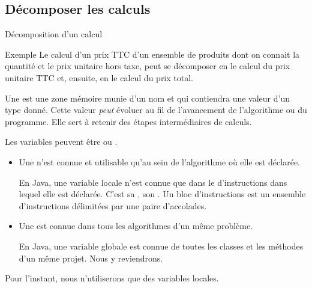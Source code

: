 \begin{hideedit}
\subsection{Décomposer les calculs}
\begin{frame}{Décomposition d'un calcul}
  \begin{block}{Exemple}
    Le calcul d'un prix TTC d'un ensemble de produits dont on connait la
    quantité et le prix unitaire hors taxe, peut se décomposer en le calcul
    du prix unitaire TTC et, ensuite, en le calcul du prix total.
  \end{block}
\end{frame}

\begin{frame}
  \begin{definition}[Variable]
    Une  est une zone mémoire munie
    d'un nom et qui contiendra une valeur d’un type donné.  Cette valeur
    \emph{peut} évoluer au fil de l'avancement de l'algorithme ou du
    programme.  Elle sert à retenir des étapes intermédiaires de
    calculs.
  \end{definition}
\end{frame}

\begin{frame}
  Les variables peuvent être  ou .

  \begin{itemize}
    \item Une  n'est
      connue et utilisable qu'au sein de l'algorithme où elle est
      déclarée.

      En Java, une variable locale n'est connue que dans le
       d'instructions dans lequel elle est déclarée.
      C'est sa , son .
      Un bloc d'instructions est un ensemble
      d'instructions délimitées par une paire d'accolades.

    \item Une  est
      connue dans tous les algorithmes d'un même problème.

      En Java, une variable globale est connue de toutes les
      classes et les méthodes d'un même projet. Nous y reviendrons.
  \end{itemize}

  Pour l'instant, nous n'utiliserons que des variables locales.
\end{frame}


\end{hideedit}
